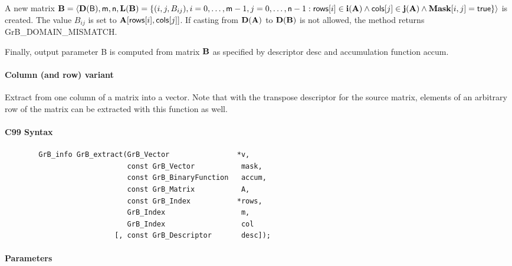 A new matrix ${\bf B} = \langle \bold{D}({\sf B}),{\sf m},{\sf n},
\bold{L}({\bf B}) = \{ (i,j,B_{ij}), i = 0,\ldots,{\sf m}-1, j = 0, \ldots,{\sf n}-1 : {\sf rows}[i]
\in \bold{i}({\bf A}) \wedge {\sf cols}[j] \in \bold{j}({\bf A}) \wedge {\bf Mask}[i,j] = {\sf true} \} \rangle$
is created.  The value $B_{ij}$ is set to ${\bf A}[{\sf rows}[i],{\sf cols}[j]]$. If
casting from $\bold{D}({\bf A})$ to $\bold{D}({\bf B})$ is not
allowed, the method returns {\sf GrB\_DOMAIN\_MISMATCH}.

Finally, output parameter {\sf B} is computed from matrix ${\bf B}$ as
specified by descriptor {\sf desc} and accumulation function {\sf accum}.

\paragraph{Column (and row) variant}

Extract from one column of a matrix into a vector.  Note that with the transpose
descriptor for the source matrix, elements of an arbitrary row of the matrix
can be extracted with this function as well.

\paragraph{C99 Syntax}

\begin{verbatim}
        GrB_info GrB_extract(GrB_Vector                *v,
                             const GrB_Vector           mask,
                             const GrB_BinaryFunction   accum,
                             const GrB_Matrix           A,
                             const GrB_Index           *rows,
                             GrB_Index                  m,
                             GrB_Index                  col
                          [, const GrB_Descriptor       desc]); 
\end{verbatim}

\paragraph{Parameters}

